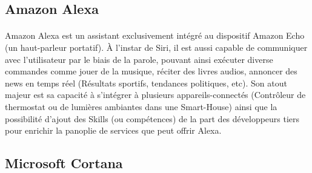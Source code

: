 \subsection{Amazon Alexa}\label{alexa}
\paragraph{}Amazon Alexa est un assistant exclusivement intégré au dispositif Amazon Echo (un haut-parleur portatif). À l'instar de Siri, il est aussi capable de communiquer avec l'utilisateur par le biais de la parole, pouvant ainsi exécuter diverse commandes comme jouer de la musique, réciter des livres audios, annoncer des news en temps réel (Résultats sportifs, tendances politiques, etc). Son atout majeur est sa capacité à s'intégrer à plusieurs appareils-connectés (Contrôleur de thermostat ou de lumières ambiantes dans une Smart-House) ainsi que la possibilité d'ajout des Skills (ou compétences) de la part des développeurs tiers pour enrichir la panoplie de services que peut offrir Alexa.


\subsection{Microsoft Cortana}
